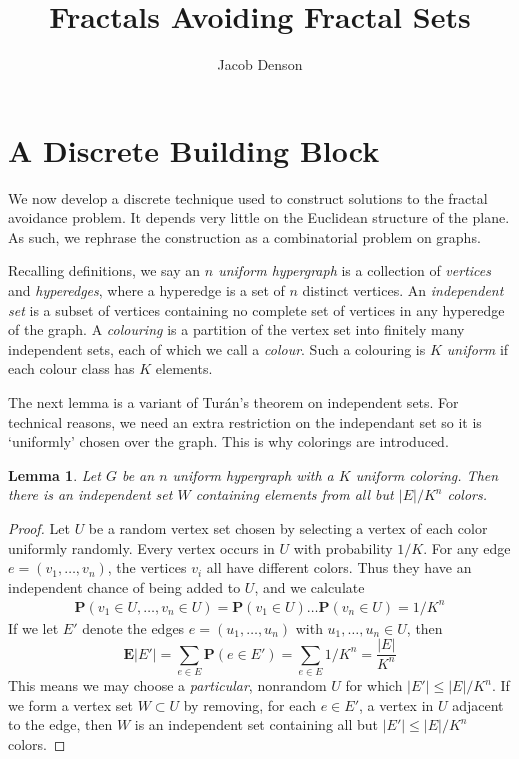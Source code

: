 \documentclass{article}
\title{Fractals Avoiding Fractal Sets}
\author{Jacob Denson}
\theoremstyle{plain}
\newtheorem{lemma}{Lemma}
\theoremstyle{plain}
\begin{document}
\maketitle


\section{A Discrete Building Block}

We now develop a discrete technique used to construct solutions to the fractal avoidance problem. It depends very little on the Euclidean structure of the plane. As such, we rephrase the construction as a combinatorial problem on graphs.

Recalling definitions, we say an {\it $n$ uniform hypergraph} is a collection of {\it vertices} and {\it hyperedges}, where a hyperedge is a set of $n$ distinct vertices. An {\it independent set} is a subset of vertices containing no complete set of vertices in any hyperedge of the graph. A {\it colouring} is a partition of the vertex set into finitely many independent sets, each of which we call a {\it colour}. Such a colouring is {\it $K$ uniform} if each colour class has $K$ elements.

The next lemma is a variant of Tur\'{a}n's theorem on independent sets. For technical reasons, we need an extra restriction on the independant set so it is `uniformly' chosen over the graph. This is why colorings are introduced.

\begin{lemma}
	Let $G$ be an $n$ uniform hypergraph with a $K$ uniform coloring. Then there is an independent set $W$ containing elements from all but $|E|/K^n$ colors.
\end{lemma}
\begin{proof}
	Let $U$ be a random vertex set chosen by selecting a vertex of each color uniformly randomly. Every vertex occurs in $U$ with probability $1/K$. For any edge $e = (v_1, \dots, v_n)$, the vertices $v_i$ all have different colors. Thus they have an independent chance of being added to $U$, and we calculate
	\begin{align*}
		\mathbf{P}(v_1 \in U, \dots, v_n \in U) = \mathbf{P}(v_1 \in U) \dots \mathbf{P}(v_n \in U) = 1/K^n
	\end{align*}
	If we let $E'$ denote the edges $e = (u_1, \dots, u_n)$ with $u_1, \dots, u_n \in U$, then
	\[ \mathbf{E}|E'| = \sum_{e \in E} \mathbf{P}(e \in E') = \sum_{e \in E} 1/K^n = \frac{|E|}{K^n} \]
	This means we may choose a {\it particular}, nonrandom $U$ for which $|E'| \leq |E|/K^n$. If we form a vertex set $W \subset U$ by removing, for each $e \in E'$, a vertex in $U$ adjacent to the edge, then $W$ is an independent set containing all but $|E'| \leq |E|/K^n$ colors.
\end{proof}
\end{document}
